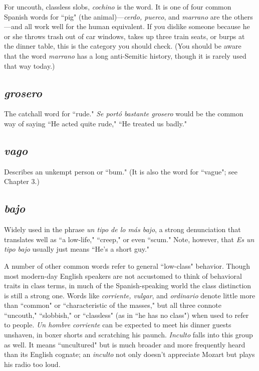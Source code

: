 For uncouth, classless slobs, \emph{cochino} is the word. It is one of
four common Spanish words for ``pig" (the animal)---\emph{cerdo, puerco},
and \emph{marrano} are the others---and all work well for the human equivalent. If you dislike someone because he or she throws trash out of car
windows, takes up three train seats, or burps at the dinner table, this is
the category you should check. (You should be aware that the word
\emph{marrano} has a long anti-Semitic history, though it is rarely used that
way today.)

\subsection{\emph{grosero}}

The catchall word for ``rude." \emph{Se portó bastante
	grosero} would be the common way of saying ``He acted quite rude,"
``He treated us badly."

\subsection{\emph{vago}}

Describes an unkempt person or ``bum." (It is also the
word for ``vague"; see Chapter 3.)

\subsection{\emph{bajo}}

Widely used in the phrase \emph{un tipo de lo más bajo}, a
strong denunciation that translates well as ``a low-life," ``creep," or
even ``scum." Note, however, that \emph{Es un tipo bajo} usually just means
``He's a short guy."

\bsk

A number of other common words refer to general ``low-class"
behavior. Though most modern-day English speakers are not accustomed to think of behavioral traits in class terms, in much of the
Spanish-speaking world the class distinction is still a strong one.
Words like \emph{corriente, vulgar}, and \emph{ordinario} denote little more than
``common" or ``characteristic of the masses," but all three connote
``uncouth," ``slobbish," or ``classless" (as in ``he has no class") when
used to refer to people. \emph{Un hombre corriente} can be expected to meet
his dinner guests unshaven, in boxer shorts and scratching his paunch.
\emph{Inculto} falls into this group as well. It means ``uncultured" but is
much broader and more frequently heard than its English cognate; an
\emph{inculto} not only doesn't appreciate Mozart but plays his radio too loud.

